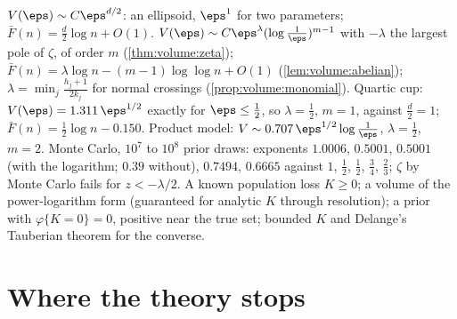 \begin{refsection}
{$V(\eps)\sim C\eps^{d/2}$: an ellipsoid, $\eps^1$ for two parameters; $\bar F(n)=\frac d2\log n+O(1)$.}
{$V(\eps)\sim C\eps^\lambda(\log\frac1\eps)^{m-1}$ with $-\lambda$ the largest pole of $\zeta$, of order $m$ (\cref{thm:volume:zeta}); $\bar F(n)=\lambda\log n-(m-1)\log\log n+O(1)$ (\cref{lem:volume:abelian}); $\lambda=\min_j\frac{h_j+1}{2k_j}$ for normal crossings (\cref{prop:volume:monomial}).}
{Quartic cup: $V(\eps)=1.311\,\eps^{1/2}$ exactly for $\eps\le\frac12$, so $\lambda=\frac12$, $m=1$, against $\frac d2=1$; $\bar F(n)=\frac12\log n-0.150$. Product model: $V\sim0.707\,\eps^{1/2}\log\frac1\eps$, $\lambda=\frac12$, $m=2$.}
{Monte Carlo, $10^7$ to $10^8$ prior draws: exponents $1.0006$, $0.5001$, $0.5001$ (with the logarithm; $0.39$ without), $0.7494$, $0.6665$ against $1$, $\frac12$, $\frac12$, $\frac34$, $\frac23$; $\zeta$ by Monte Carlo fails for $z<-\lambda/2$.}
{A known population loss $K\ge0$; a volume of the power-logarithm form (guaranteed for analytic $K$ through resolution); a prior with $\varphi\{K=0\}=0$, positive near the true set; bounded $K$ and Delange's Tauberian theorem for the converse.}

\section{Where the theory stops}\label{sec:volume:stops}


\end{refsection}

